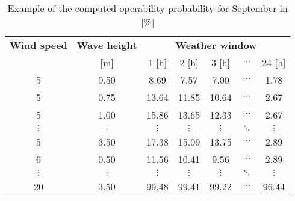 \begin{table}
\label{tab:proba}
\begin{tabular}{ccccccc}
\hline
{\bf Wind speed} & {\bf Wave height} & \multicolumn{ 5}{c}{{\bf Weather window}} \\
[m/s]      &      [m]      &          1 [h] &          2 [h] &          3 [h] &  $\cdots$ &         24 [h] \\
\hline
      5 &       0.50 &       8.69 &       7.57 &       7.00 &  $\cdots$ &       1.78 \\
      5 &       0.75 &      13.64 &      11.85 &      10.64 &  $\cdots$ &       2.67 \\
      5 &       1.00 &      15.86 &      13.65 &      12.33 &  $\cdots$ &       2.67 \\
 $\vdots$ &  $\vdots$ &  $\vdots$ &  $\vdots$ &  $\vdots$ &  $\ddots$ &  $\vdots$ \\
      5 &       3.50 &      17.38 &      15.09 &      13.75 &  $\cdots$ &       2.89 \\
      6 &       0.50 &      11.56 &      10.41 &       9.56 &  $\cdots$ &       2.89 \\
 $\vdots$ &  $\vdots$ &  $\vdots$ &  $\vdots$ &  $\vdots$ & $\ddots$           &  $\vdots$ \\
     20 &       3.50 &      99.48 &      99.41 &      99.22 &  $\cdots$ &      96.44 \\
\hline
\end{tabular}  

\caption{Example of the computed operability probability for September in [\%]}
\end{table}